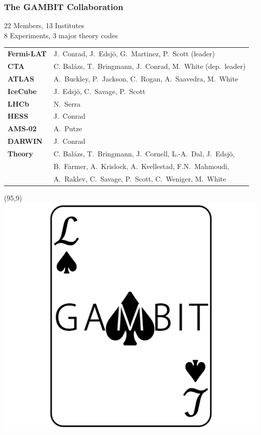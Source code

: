 \documentclass[xcolor=dvipsnames]{beamer}
\begin{document}
\begin{frame}
\frametitle{The GAMBIT Collaboration}

\vspace{10mm}
22 Members, 13 Institutes \\
8 Experiments, 3 major theory codes \vspace{3mm}

\begin{tabular}{l l}
\textbf{Fermi-LAT} & \small J.\ Conrad, J.\ Edsj\"o, G.\ Martinez, P.\ Scott (leader)\\
\textbf{CTA} & \small C. Bal\'azs, T.\ Bringmann, J.\ Conrad, M.\ White (dep.\ leader)\\
\textbf{ATLAS} & \small A.\ Buckley, P.\ Jackson, C.\ Rogan, A.\ Saavedra, M.\ White\\
\textbf{IceCube} & \small J.\ Edsj\"o, C.\ Savage, P.\ Scott\\
\textbf{LHCb} & \small N.\ Serra\\
\textbf{HESS} & \small J.\ Conrad \\
\textbf{AMS-02} & \small A.\ Putze\\
\textbf{DARWIN} & \small J.\ Conrad\\
\textbf{Theory} & \small C. Bal\'azs, T.\ Bringmann, J.\ Cornell, L.-A.\ Dal, J.\ Edsj\"o, \\
                & \small B.\ Farmer, A.\ Krislock, A.\ Kvellestad, F.N.\ Mahmoudi, \\
                & \small A.\ Raklev, C.\ Savage, P.\ Scott, C.\ Weniger, M.\ White \\	
\end{tabular}

\begin{textblock}{25}(95,9)
  \includegraphics[width=\linewidth]{Logo_Final}	
\end{textblock}

\end{frame}
\end{document}
